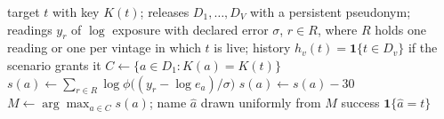 \begin{algorithm}[t]
\caption{Full-likelihood linkage attack on a programme of releases}\label{alg:attack}
\begin{algorithmic}[1]
\Require target $t$ with key $K(t)$; releases $D_1,\ldots,D_V$ with a persistent pseudonym;
  readings $y_r$ of $\log$ exposure with declared error $\sigma$, $r\in R$, where $R$ holds
  one reading or one per vintage in which $t$ is live; history
  $h_v(t)=\mathbf 1\{t\in D_v\}$ if the scenario grants it
\State $C\gets\{a\in D_1: K(a)=K(t)\}$ 
  \State $s(a)\gets\sum_{r\in R}\log\phi\bigl((y_r-\log e_a)/\sigma\bigr)$ 
       $s(a)\gets s(a)-30$ 
      \EndIf
    \EndFor
  \EndIf
\EndFor
\State $M\gets\arg\max_{a\in C}s(a)$; name $\hat a$ drawn uniformly from $M$
\State \Return success $\mathbf 1\{\hat a=t\}$
\end{algorithmic}
\end{algorithm}
